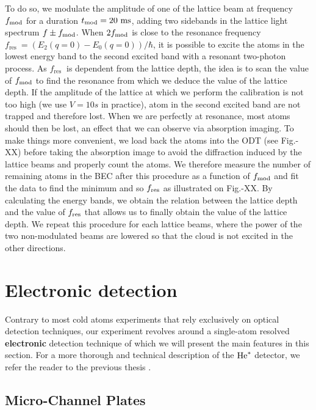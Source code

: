 To do so, we modulate the amplitude of one of the lattice beam at frequency $f_{\rm{mod}}$ for a duration $t_{\rm{mod} }= 20 \ \rm{ms}$, adding two sidebands in the lattice light spectrum $f \pm f_{\rm{mod}}$. When $2 f_{\rm{mod}}$ is close to the resonance frequency $f_{\text {res }}=\left(E_{2}(q=0)-E_{0}(q=0)\right)/\hbar$, it is possible to excite the atoms in the lowest energy band to the second excited band with a resonant two-photon process. As $f_{\text {res }}$ is dependent from the lattice depth, the idea is to scan the value of $f_{\rm{mod}}$ to find the resonance from which we deduce the value of the lattice depth. If the amplitude of the lattice at which we perform the calibration is not too high (we use $V= 10s$ in practice), atom in the second excited band are not trapped and therefore lost. When we are perfectly at resonance, most atoms should then be lost, an effect that we can observe via absorption imaging. To make things more convenient, we load back the atoms into the ODT (see Fig.-XX) before taking the absorption image to avoid the diffraction induced by the lattice beams and properly count the atoms. We therefore measure the number of remaining atoms in the BEC after this procedure as a function of $f_{\rm{mod}}$ and fit the data to find the minimum and so $f_{\rm{res}}$ as illustrated on Fig.-XX. By calculating the energy bands, we obtain the relation between the lattice depth and the value of $f_{\rm{res}}$ that allows us to finally obtain the value of the lattice depth. We repeat this procedure for each lattice beams, where the power of the two non-modulated beams are lowered so that the cloud is not excited in the other directions.

\section{Electronic detection}

Contrary to most cold atoms experiments that rely exclusively on optical detection techniques, our experiment revolves around a single-atom resolved \textbf{electronic} detection technique of which we will present the main features in this section. For a more thorough and technical description of the $\mathrm{He}^*$ detector, we refer the reader to the previous thesis \cite{cayla_these}.

\subsection{Micro-Channel Plates}

